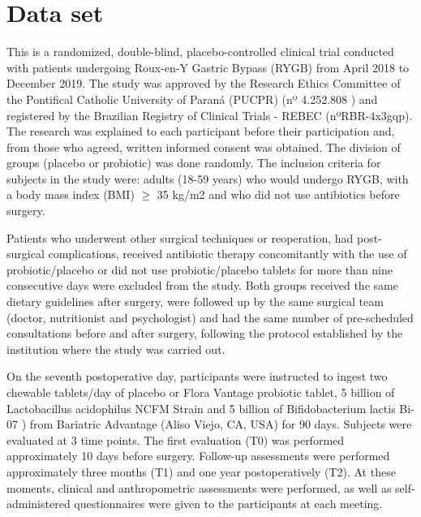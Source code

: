 \documentclass[Review,sagev,times, doublespace]{sagej}
\begin{document}

\section{Data set}\label{sec2}


This is a randomized, double-blind, placebo-controlled clinical trial conducted with patients undergoing Roux-en-Y Gastric Bypass (RYGB) from April 2018 to December 2019. The study was approved by the Research Ethics Committee of the Pontifical Catholic University of Paraná (PUCPR) (nº 4.252.808 ) and registered by the Brazilian Registry of Clinical Trials - REBEC (nºRBR-4x3gqp). The research was explained to each participant before their participation and, from those who agreed, written informed consent was obtained. The division of groups (placebo or probiotic) was done randomly. The inclusion criteria for subjects in the study were: adults (18-59 years) who would undergo RYGB, with a body mass index (BMI) $\geq$ 35 kg/m2 and who did not use antibiotics before surgery. 

Patients who underwent other surgical techniques or reoperation, had post-surgical complications, received antibiotic therapy concomitantly with the use of probiotic/placebo or did not use probiotic/placebo tablets for more than nine consecutive days were excluded from the study. Both groups received the same dietary guidelines after surgery, were followed up by the same surgical team (doctor, nutritionist and psychologist) and had the same number of pre-scheduled consultations before and after surgery, following the protocol established by the institution where the study was carried out.

On the seventh postoperative day, participants were instructed to ingest two chewable tablets/day of placebo or Flora Vantage probiotic tablet, 5 billion of Lactobacillus acidophilus NCFM \textregistered Strain and 5 billion of Bifidobacterium lactis Bi-07 \textregistered) from Bariatric Advantage (Aliso Viejo, CA, USA) for 90 days. Subjects were evaluated at 3 time points. The first evaluation (T0) was performed approximately 10 days before surgery. Follow-up assessments were performed approximately three months (T1) and one year postoperatively (T2). At these moments, clinical and anthropometric assessments were performed, as well as self-administered questionnaires were given to the participants at each meeting.
\end{document}
